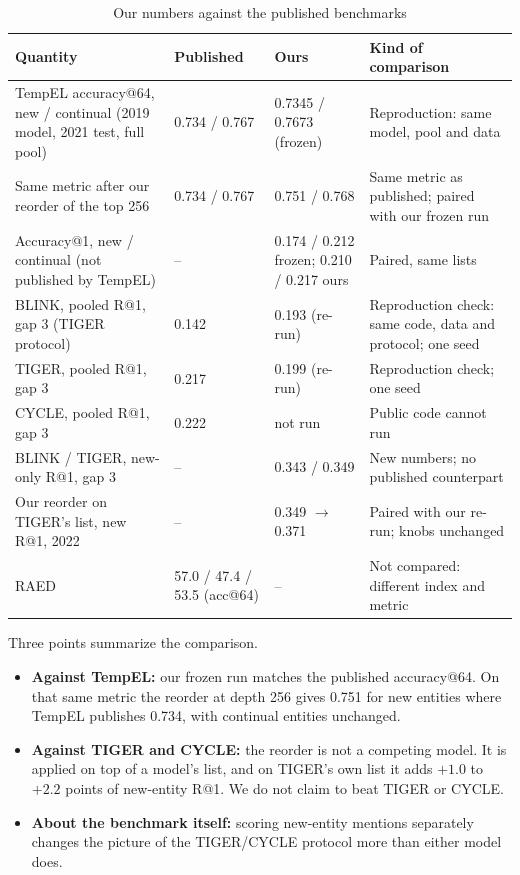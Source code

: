 \documentclass[conference]{IEEEtran}
\begin{document}
\begin{table}[t]
\caption{Our numbers against the published benchmarks}
\label{tab:comp}
\centering
\footnotesize
\begin{tabular}{p{5.2cm}p{3.3cm}p{3.6cm}p{4.4cm}}
\toprule
Quantity & Published & Ours & Kind of comparison \\
\midrule
TempEL accuracy@64, new / continual (2019 model, 2021 test, full pool)
 & 0.734 / 0.767 \cite{tempel}
 & 0.7345 / 0.7673 (frozen)
 & Reproduction: same model, pool and data \\
Same metric after our reorder of the top 256
 & 0.734 / 0.767 \cite{tempel}
 & 0.751 / 0.768
 & Same metric as published; paired with our frozen run \\
Accuracy@1, new / continual (not published by TempEL)
 & --
 & 0.174 / 0.212 frozen; 0.210 / 0.217 ours
 & Paired, same lists \\
BLINK, pooled R@1, gap 3 (TIGER protocol)
 & 0.142 \cite{tiger}
 & 0.193 (re-run)
 & Reproduction check: same code, data and protocol; one seed \\
TIGER, pooled R@1, gap 3
 & 0.217 \cite{tiger}
 & 0.199 (re-run)
 & Reproduction check; one seed \\
CYCLE, pooled R@1, gap 3
 & 0.222 \cite{cycle}
 & not run
 & Public code cannot run \\
BLINK / TIGER, new-only R@1, gap 3
 & --
 & 0.343 / 0.349
 & New numbers; no published counterpart \\
Our reorder on TIGER's list, new R@1, 2022
 & --
 & 0.349 $\rightarrow$ 0.371
 & Paired with our re-run; knobs unchanged \\
RAED \cite{raed}
 & 57.0 / 47.4 / 53.5 (acc@64)
 & --
 & Not compared: different index and metric \\
\bottomrule
\end{tabular}
\end{table}

Three points summarize the comparison.
\begin{itemize}
\item \textbf{Against TempEL:} our frozen run matches the published accuracy@64. On that same metric
the reorder at depth 256 gives 0.751 for new entities where TempEL publishes 0.734, with continual
entities unchanged.
\item \textbf{Against TIGER and CYCLE:} the reorder is not a competing model. It is applied on top of
a model's list, and on TIGER's own list it adds $+1.0$ to $+2.2$ points of new-entity R@1. We do not
claim to beat TIGER or CYCLE.
\item \textbf{About the benchmark itself:} scoring new-entity mentions separately changes the picture
of the TIGER/CYCLE protocol more than either model does.
\end{itemize}
\end{document}
